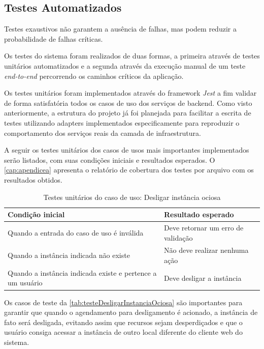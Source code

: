 \subsection{Testes Automatizados}
\label{subsec:testesAutomatizados}

Testes exaustivos não garantem a ausência de falhas, mas podem reduzir a probabilidade de falhas críticas. \citep{pressman2016}

Os testes do sistema foram realizados de duas formas, a primeira através de testes unitários automatizados e a segunda através da execução manual de um teste \textit{end-to-end} percorrendo os caminhos críticos da aplicação.

Os testes unitários foram implementados através do framework \textit{Jest} a fim validar de forma satisfatória todos os casos de uso dos serviços de backend. Como visto anteriormente, a estrutura do projeto já foi planejada para facilitar a escrita de testes utilizando \glspl{adapter} implementados especificamente para reproduzir o comportamento dos serviços reais da camada de infraestrutura.

A seguir os testes unitários dos casos de usos mais importantes implementados serão listados, com suas condições iniciais e resultados esperados. O \autoref{cap:apendicea} apresenta o relatório de cobertura dos testes por arquivo com os resultados obtidos.

\begin{table}[h]
\caption{Testes unitários do caso de uso: Desligar instância ociosa}
\label{tab:testeDesligarInstanciaOciosa}
\begin{tabularx}{\textwidth}{p{} p{}}
\toprule
\textbf{Condição inicial} & \textbf{Resultado esperado} \\ \midrule

Quando a entrada do caso de uso é inválida & Deve retornar um erro de validação \\ \hline

Quando a instância indicada não existe & Não deve realizar nenhuma ação \\ \hline

Quando a instância indicada existe e pertence a um usuário & Deve desligar a instância \\ 

\bottomrule
\end{tabularx}
\end{table}

Os casos de teste da \autoref{tab:testeDesligarInstanciaOciosa} são importantes para garantir que quando o agendamento para desligamento é acionado, a instância de fato será desligada, evitando assim que recursos sejam desperdiçados e que o usuário consiga acessar a instância de outro local diferente do cliente web do sistema.


